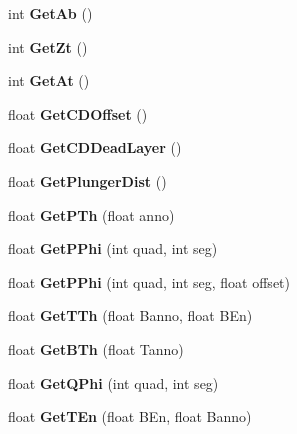 \begin{DoxyCompactItemize}
int {\bfseries Get\+Ab} ()
\item 
\mbox{\label{classdoppler_ac0587ca2b963edec86d17dd6dac024ce}} 
int {\bfseries Get\+Zt} ()
\item 
\mbox{\label{classdoppler_a72bb0dc1707c0f2bf4b978caf06f2cf1}} 
int {\bfseries Get\+At} ()
\item 
\mbox{\label{classdoppler_ac7725720fab82af5a5a6f02041bc9483}} 
float {\bfseries Get\+C\+D\+Offset} ()
\item 
\mbox{\label{classdoppler_a2c1aef6db4ad3fc0c98e91d995992706}} 
float {\bfseries Get\+C\+D\+Dead\+Layer} ()
\item 
\mbox{\label{classdoppler_accc85c5ab5f322ec2c321f7653ccc40f}} 
float {\bfseries Get\+Plunger\+Dist} ()
\item 
\mbox{\label{classdoppler_a1415bdb47dbb9d5eba7f14a64bd3693e}} 
float {\bfseries Get\+P\+Th} (float anno)
\item 
\mbox{\label{classdoppler_a0f57a8f4a8c369c14d52e62dd3833f2e}} 
float {\bfseries Get\+P\+Phi} (int quad, int seg)
\item 
\mbox{\label{classdoppler_ac8f059cc77214a954be534a85c748a3c}} 
float {\bfseries Get\+P\+Phi} (int quad, int seg, float offset)
\item 
\mbox{\label{classdoppler_a7865dcf92a6b18d23cb48e9e624e505b}} 
float {\bfseries Get\+T\+Th} (float Banno, float B\+En)
\item 
\mbox{\label{classdoppler_ac834d80156ae80009b508ae41fedde3d}} 
float {\bfseries Get\+B\+Th} (float Tanno)
\item 
\mbox{\label{classdoppler_a7c3afd05ed9ddb8c5bedc0de905acd0b}} 
float {\bfseries Get\+Q\+Phi} (int quad, int seg)
\item 
\mbox{\label{classdoppler_a31a09afe8920dc1302162ec8e0be9302}} 
float {\bfseries Get\+T\+En} (float B\+En, float Banno)

\end{DoxyCompactItemize}
